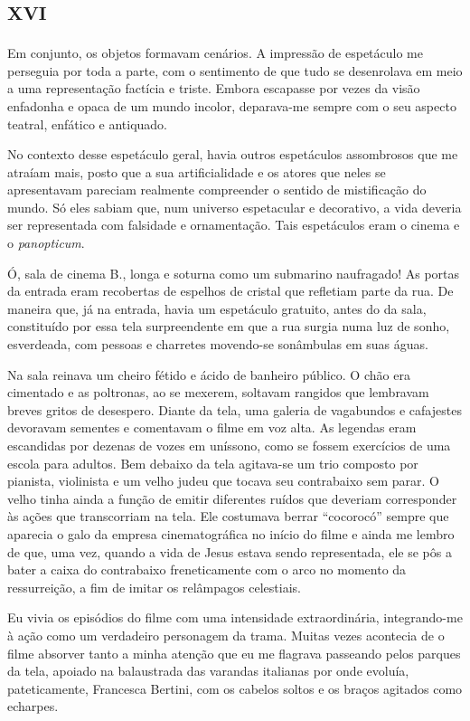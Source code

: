 \chapter*{\huge\centering\textsc{xvi}}

Em conjunto, os objetos formavam cenários. A impressão de espetáculo me perseguia por toda a parte, com o sentimento de que tudo se desenrolava em meio a uma representação factícia e triste. Embora escapasse por vezes da visão enfadonha e opaca de um mundo incolor, deparava-me sempre com o seu aspecto teatral, enfático e antiquado.

No contexto desse espetáculo geral, havia outros espetáculos assombrosos que me atraíam mais, posto que a sua artificialidade e os atores que neles se apresentavam pareciam realmente compreender o sentido de mistificação do mundo. Só eles sabiam que, num universo espetacular e decorativo, a vida deveria ser representada com falsidade e ornamentação. Tais espetáculos eram o cinema e o \textit{panopticum}. 

Ó, sala de cinema B., longa e soturna como um submarino naufragado! As portas da entrada eram recobertas de espelhos de cristal que refletiam parte da rua. De maneira que, já na entrada, havia um espetáculo gratuito, antes do da sala, constituído por essa tela surpreendente em que a rua surgia numa luz de sonho, esverdeada, com pessoas e charretes movendo-se sonâmbulas em suas águas.

Na sala reinava um cheiro fétido e ácido de banheiro público. O chão era cimentado e as poltronas, ao se mexerem, soltavam rangidos que lembravam breves gritos de desespero. Diante da tela, uma galeria de vagabundos e cafajestes devoravam sementes e comentavam o filme em voz alta. As legendas eram escandidas por dezenas de vozes em uníssono, como se fossem exercícios de uma escola para adultos. Bem debaixo da tela agitava-se um trio composto por pianista, violinista e um velho judeu que tocava seu contrabaixo sem parar. O velho tinha ainda a função de emitir diferentes ruídos que deveriam corresponder às ações que transcorriam na tela. Ele costumava berrar ``cocorocó'' sempre que aparecia o galo da empresa cinematográfica no início do filme e ainda me lembro de que, uma vez, quando a vida de Jesus estava sendo representada, ele se pôs a bater a caixa do contrabaixo freneticamente com o arco no momento da ressurreição, a fim de imitar os relâmpagos celestiais.

Eu vivia os episódios do filme com uma intensidade extraordinária, integrando-me à ação como um verdadeiro personagem da trama. Muitas vezes acontecia de o filme absorver tanto a minha atenção que eu me flagrava passeando pelos parques da tela, apoiado na balaustrada das varandas italianas por onde evoluía, pateticamente, Francesca Bertini,  com os cabelos soltos e os braços agitados como echarpes.

